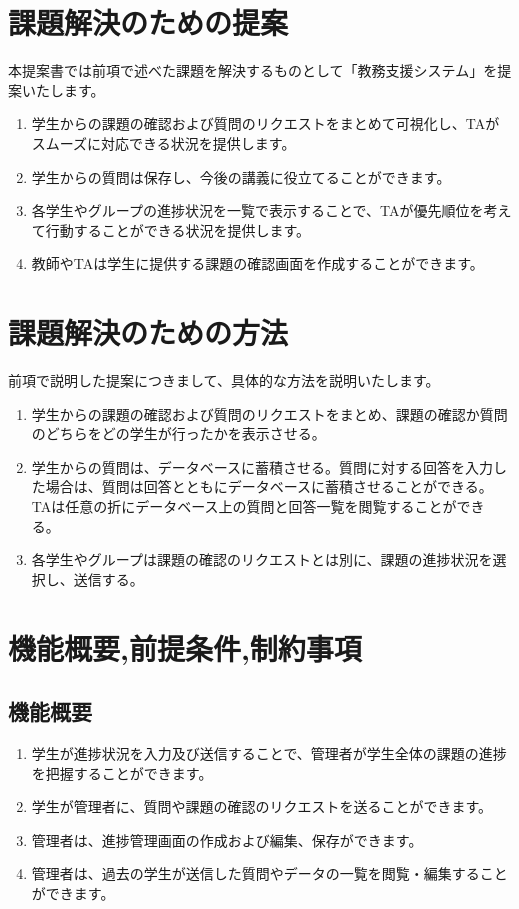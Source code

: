 \documentclass[a4j,titlepage]{ujarticle}
\begin{document}
\section{課題解決のための提案}
本提案書では前項で述べた課題を解決するものとして「教務支援システム」を提案いたします。

\begin{enumerate}[(1)]
\item 学生からの課題の確認および質問のリクエストをまとめて可視化し、TAがスムーズに対応できる状況を提供します。
\item 学生からの質問は保存し、今後の講義に役立てることができます。
\item 各学生やグループの進捗状況を一覧で表示することで、TAが優先順位を考えて行動することができる状況を提供します。
\item 教師やTAは学生に提供する課題の確認画面を作成することができます。
\end{enumerate}

\section{課題解決のための方法}
前項で説明した提案につきまして、具体的な方法を説明いたします。
\begin{enumerate}[(1)]
\item 学生からの課題の確認および質問のリクエストをまとめ、課題の確認か質問のどちらをどの学生が行ったかを表示させる。
\item 学生からの質問は、データベースに蓄積させる。質問に対する回答を入力した場合は、質問は回答とともにデータベースに蓄積させることができる。TAは任意の折にデータベース上の質問と回答一覧を閲覧することができる。
\item 各学生やグループは課題の確認のリクエストとは別に、課題の進捗状況を選択し、送信する。
\end{enumerate}

\section{機能概要,前提条件,制約事項}

\subsection{機能概要}
\begin{enumerate}[(1)]
\item 学生が進捗状況を入力及び送信することで、管理者が学生全体の課題の進捗を把握することができます。
\item 学生が管理者に、質問や課題の確認のリクエストを送ることができます。
\item 管理者は、進捗管理画面の作成および編集、保存ができます。
\item 管理者は、過去の学生が送信した質問やデータの一覧を閲覧・編集することができます。　
\end{enumerate}
\end{document}
